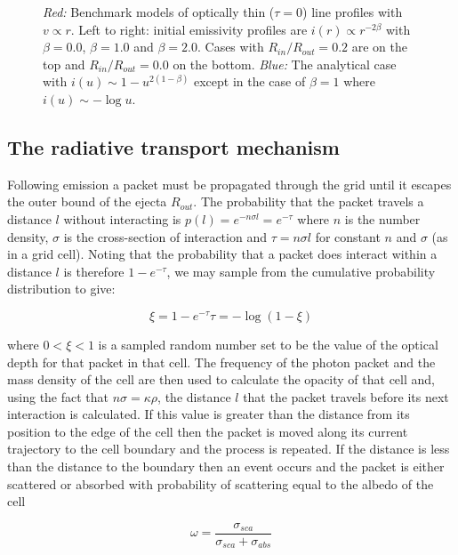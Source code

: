\documentclass[useAMS,usenatbib,usegraphicx]{mnras}
\begin{document}
\begin{figure}
\caption{\textit{Red:} Benchmark models of optically thin ($\tau =0$) line profiles  with $v \propto r$. Left to right: initial emissivity profiles are $i(r) \propto r^{-2\beta}$ with $\beta=0.0$, $\beta=1.0$ and $\beta=2.0$. Cases with $R_{in}/R_{out}=0.2$ are on the top and $R_{in}/R_{out}=0.0$ on the bottom.  \textit{Blue:} The analytical case with $i(u) \sim 1-u^{2(1-\beta)}$ except in the case of $\beta=1$ where $i(u) \sim -\log u$.}
\label{fig:analytics}
\end{figure}

\subsection{The radiative transport mechanism}
\label{transport}

Following emission a packet must be propagated through the grid until it escapes the outer bound of the ejecta $R_{out}$.  The probability that the packet travels a distance $l$ without interacting is 
$p(l)=e ^{-n \sigma l}=e ^{-\tau} $
where $n$ is the number density, $\sigma$ is the cross-section of interaction and $ \tau = n\sigma l$ for constant $n$ and $\sigma$ (as in a grid cell).  Noting that the probability that a packet does interact within a distance $l$ is therefore $1-e^{-\tau}$, we may sample from the cumulative probability distribution to give: 

\begin{equation}
\xi = 1 - e^{-\tau}   \tau=-\log (1-\xi)
\end{equation}

\noindent where $0<\xi<1$ is a sampled random number set to be the value of the optical depth for that packet in that cell.  The frequency of the photon packet and the mass density of the cell are then used to calculate the opacity of that cell and, using the fact that $n\sigma=\kappa\rho$, the distance $l$ that the packet travels before its next interaction is calculated.  If this value is greater than the distance from its position to the edge of the cell then the packet is moved along its current trajectory to the cell boundary and the process is repeated.  If the distance is less than the distance to the boundary then an event occurs and the packet is either scattered or absorbed with probability of scattering equal to the albedo of the cell

\begin{equation}
	\omega=\frac{\sigma_{sca}}{\sigma_{sca}+\sigma_{abs}}
\end{equation}
\end{document}
